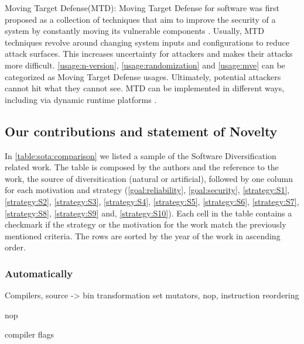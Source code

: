 \begin{usage}{Moving Target Defense(MTD):}
    \label{usage:mtd}
    \normalfont
    Moving Target Defense for software was first proposed as a collection of techniques that aim to improve the security of a system by constantly moving its vulnerable components \cite{MTDNationalCyberLaep}. Usually, MTD techniques revolve around changing system inputs and configurations to reduce attack surfaces. 
    This increases uncertainty for attackers and makes their attacks more difficult. \autoref{usage:n-version}, \autoref{usage:randomization} and \autoref{usage:mve} can be categorized as Moving Target Defense usages. Ultimately, potential attackers cannot hit what they cannot see. 
    MTD can be implemented in different ways, including via dynamic runtime platforms \cite{10.1145/3318216.3363338}. 
\end{usage}




\subsection*{Our contributions and statement of Novelty}



In \autoref{table:sota:comparison} we listed a sample of the Software Diversification related work. The table is composed by the authors and the reference to the work, the source of diversitication (natural or artificial), followed by one column for each motivation and strategy (\autoref{goal:reliability},  \autoref{goal:security},  \autoref{strategy:S1},  \autoref{strategy:S2},  \autoref{strategy:S3},  \autoref{strategy:S4},  \autoref{strategy:S5},  \autoref{strategy:S6},  \autoref{strategy:S7},  \autoref{strategy:S8},  \autoref{strategy:S9} and, \autoref{strategy:S10}). Each cell in the table contains a checkmark if the strategy or the motivation for the work match the previously mentioned criteria. The rows are sorted by the year of the work in ascending order.




\subsubsection{Automatically}
    Compilers, source -> bin transformation
        set mutators, nop, instruction reordering

    nop
    
    

    compiler flags


